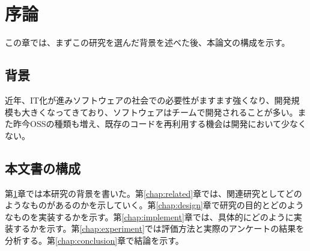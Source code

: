 \chapter{序論}
\label{chap:introduction}

この章では、まずこの研究を選んだ背景を述べた後、本論文の構成を示す。

\section{背景}

近年、IT化が進みソフトウェアの社会での必要性がますます強くなり、開発規模も大きくなってきており、ソフトウェアはチームで開発されることが多い。また昨今OSSの種類も増え、既存のコードを再利用する機会は開発において少なくない。

\section{本文書の構成}

第\ref{chap:introduction}章では本研究の背景を書いた。第\ref{chap:related}章では、関連研究としてどのようなものがあるのかを示していく。第\ref{chap:design}章で研究の目的とどのようなものを実装するかを示す。第\ref{chap:implement}章では、具体的にどのように実装するかを示す。第\ref{chap:experiment}では評価方法と実際のアンケートの結果を分析する。第\ref{chap:conclusion}章で結論を示す。